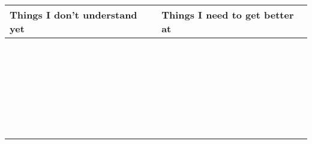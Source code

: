\documentclass[a4paper]{article}
\theoremstyle{definition}
\begin{document}
\setlength{\tabcolsep}{2.5em}
\begin{center}
\hspace{-2em}\begin{tabular}{l|l}
  \textbf{Things I don't understand yet} &
   \textbf{Things I need to get better at} \\ \hline
  & \\
  & \\
                                         & \\
                                         & \\
                                         & \\
                                         & \\
                                         & \\
                                         & \\
                                         & \\
                                         & \\
                                         & \\
                                         & \\
                                         & \\
                                         & \\
                                         & \\
                                         & \\
                                         & \\
                                         & \\
                                         & \\
                                         & \\
                                         & \\
                                         & \\
                                         & \\
                                         & \\
                                         & \\
                                         & \\
                                         & \\
                                         & \\

\end{tabular}
\end{center}
\end{document}

